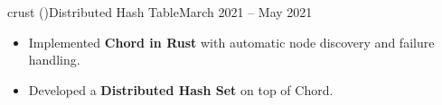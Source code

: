 \begin{cvsubsection}{crust \normalfont(\href{ https://github.com/a3y3/crust}{})}{Distributed Hash Table}{March 2021 -- May 2021}
	\begin{itemize}
        \item Implemented \textbf{Chord in Rust} with automatic node discovery and failure handling.
        \item Developed a \textbf{Distributed Hash Set} on top of Chord.
	\end{itemize}
\end{cvsubsection}